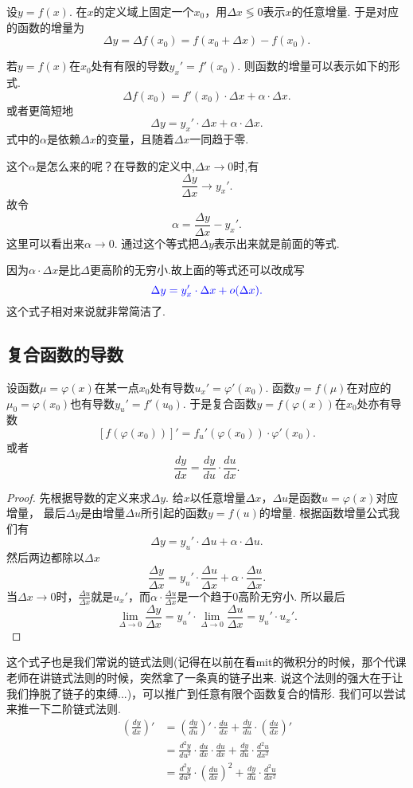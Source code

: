 \documentclass{article}
\begin{document}
设$y=f(x)$. 在$x$的定义域上固定一个$x_0$，用$\Delta x \lessgtr 0$表示$x$的任意增量. 于是对应的函数的增量为\[\Delta y = \Delta f(x_0) = f(x_0 + \Delta x) - f(x_0).\]

若$y=f(x)$在$x_0$处有有限的导数$y_x'=f'(x_0)$. 则函数的增量可以表示如下的形式.\[\Delta f(x_0) = f'(x_0) \cdot \Delta x + \alpha \cdot \Delta x.\]或者更简短地\[\Delta y = y_x' \cdot \Delta x + \alpha \cdot \Delta x.\]式中的$\alpha$是依赖$\Delta x$的变量，且随着$\Delta x$一同趋于零.

这个$\alpha$是怎么来的呢？在导数的定义中,$\Delta x \rightarrow 0$时,有\[\frac{\Delta y}{\Delta x} \rightarrow y_x'.\]故令\[\alpha = \frac{\Delta y}{\Delta x} - y_x'.\]这里可以看出来$\alpha \rightarrow 0$. 通过这个等式把$\Delta y$表示出来就是前面的等式. 

因为$\alpha \cdot \Delta x$是比$\Delta$更高阶的无穷小.故上面的等式还可以改成写\[ \color{blue} \Delta y = y_x' \cdot \Delta x + o(\Delta x).\]这个式子相对来说就非常简洁了.
\newpage
\subsection{复合函数的导数}

设函数$ \mu = \varphi(x)$在某一点$x_0$处有导数$u_x' = \varphi'(x_0)$. 函数$y=f(\mu)$在对应的$\mu_0 = \varphi(x_0)$也有导数$y_u'=f'(u_0)$. 于是复合函数$y = f(\varphi(x))$在$x_0$处亦有导数\[[f(\varphi(x_0))]' =  f_u'(\varphi(x_0))\cdot\varphi'(x_0).\]或者\[\frac{dy}{dx} = \frac{dy}{du}\cdot\frac{du}{dx}.\]

\begin{proof}
先根据导数的定义来求$\Delta y $. 给$x$以任意增量$\Delta x$，$\Delta u$是函数$u = \varphi(x)$对应增量， 最后$\Delta y$是由增量$\Delta u$所引起的函数$y = f(u)$的增量. 根据函数增量公式我们有\[\Delta y = y_u' \cdot \Delta u + \alpha \cdot \Delta u.\]然后两边都除以$\Delta x$ \[\frac{\Delta y}{\Delta x} = y_u' \cdot \frac{\Delta u}{\Delta x} + \alpha \cdot \frac{\Delta u}{\Delta x}. \]当$\Delta x \rightarrow 0$时，$\frac{\Delta u}{\Delta x}$就是$u_x'$，而$\alpha \cdot \frac{\Delta u}{\Delta x}$是一个趋于$0$高阶无穷小. 所以最后\[\lim\limits_{\Delta \rightarrow 0} \frac{\Delta y}{\Delta x} = y_u' \cdot \lim\limits_{\Delta \rightarrow 0} \frac{\Delta u}{\Delta x} = y_u' \cdot u_x'. \]
\end{proof}


这个式子也是我们常说的链式法则(记得在以前在看mit的微积分的时候，那个代课老师在讲链式法则的时候，突然拿了一条真的链子出来. 说这个法则的强大在于让我们挣脱了链子的束缚...)，可以推广到任意有限个函数复合的情形. 我们可以尝试来推一下二阶链式法则.
\begin{equation}
\begin{aligned}
\left(\frac{dy}{dx}\right)' &= \left( \frac{dy}{du} \right)' \cdot \frac{du}{dx} + \frac{dy}{du} \cdot \left( \frac{du}{dx} \right)' \\
&= \frac{d^2y}{du^2} \cdot \frac{du}{dx} \cdot \frac{du}{dx} + \frac{dy}{du} \cdot \frac{d^2u}{dx^2} \\
&= \frac{d^2y}{du^2} \cdot \left( \frac{du}{dx} \right) ^2 + \frac{dy}{du} \cdot \frac{d^2u}{dx^2}
\end{aligned}
\end{equation}
\end{document}
